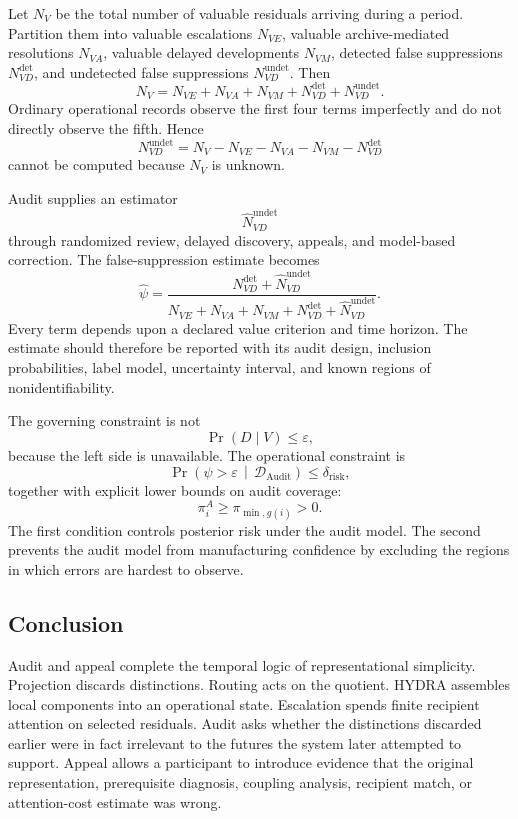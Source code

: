 \documentclass[11pt]{article}
\theoremstyle{definition}
\DeclareMathOperator{\Audit}{Audit}
\DeclareMathOperator{\Prob}{Pr}
\newcommand{\given}{\,\middle|\,}
\newcommand{\eps}{\varepsilon}
\begin{document}
Let \(N_V\) be the total number of valuable residuals arriving during a period. Partition them into valuable escalations \(N_{VE}\), valuable archive-mediated resolutions \(N_{VA}\), valuable delayed developments \(N_{VM}\), detected false suppressions \(N_{VD}^{\mathrm{det}}\), and undetected false suppressions \(N_{VD}^{\mathrm{undet}}\). Then
\[
N_V
=
N_{VE}
+
N_{VA}
+
N_{VM}
+
N_{VD}^{\mathrm{det}}
+
N_{VD}^{\mathrm{undet}}.
\]
Ordinary operational records observe the first four terms imperfectly and do not directly observe the fifth. Hence
\[
N_{VD}^{\mathrm{undet}}
=
N_V
-
N_{VE}
-
N_{VA}
-
N_{VM}
-
N_{VD}^{\mathrm{det}}
\]
cannot be computed because \(N_V\) is unknown.

Audit supplies an estimator
\[
\widehat N_{VD}^{\mathrm{undet}}
\]
through randomized review, delayed discovery, appeals, and model-based correction. The false-suppression estimate becomes
\[
\widehat{\psi}
=
\frac{
N_{VD}^{\mathrm{det}}
+
\widehat N_{VD}^{\mathrm{undet}}
}{
N_{VE}
+
N_{VA}
+
N_{VM}
+
N_{VD}^{\mathrm{det}}
+
\widehat N_{VD}^{\mathrm{undet}}
}.
\]
Every term depends upon a declared value criterion and time horizon. The estimate should therefore be reported with its audit design, inclusion probabilities, label model, uncertainty interval, and known regions of nonidentifiability.

The governing constraint is not
\[
\Prob(D\mid V)\leq\eps,
\]
because the left side is unavailable. The operational constraint is
\[
\Prob\!\left(
\psi>\eps
\given
\mathcal{D}_{\Audit}
\right)
\leq
\delta_{\mathrm{risk}},
\]
together with explicit lower bounds on audit coverage:
\[
\pi_i^{A}\geq\pi_{\min,g(i)}>0.
\]
The first condition controls posterior risk under the audit model. The second prevents the audit model from manufacturing confidence by excluding the regions in which errors are hardest to observe.

\subsection{Conclusion}

Audit and appeal complete the temporal logic of representational simplicity. Projection discards distinctions. Routing acts on the quotient. HYDRA assembles local components into an operational state. Escalation spends finite recipient attention on selected residuals. Audit asks whether the distinctions discarded earlier were in fact irrelevant to the futures the system later attempted to support. Appeal allows a participant to introduce evidence that the original representation, prerequisite diagnosis, coupling analysis, recipient match, or attention-cost estimate was wrong.
\end{document}
